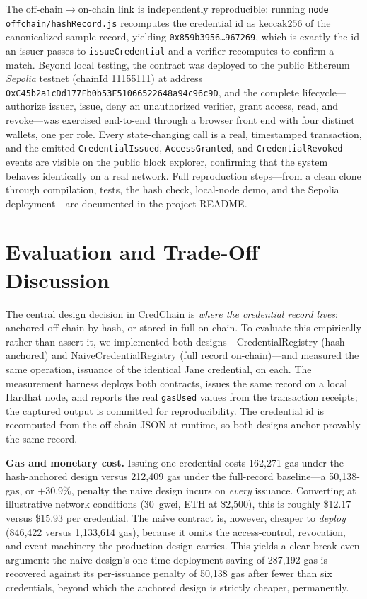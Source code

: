 \documentclass[conference]{IEEEtran}
\begin{document}
The off-chain$\rightarrow$on-chain link is independently reproducible: running \texttt{node offchain/hashRecord.js} recomputes the credential id as $\mathrm{keccak256}$ of the canonicalized sample record, yielding \texttt{0x859b3956\ldots967269}, which is exactly the id an issuer passes to \texttt{issueCredential} and a verifier recomputes to confirm a match. Beyond local testing, the contract was deployed to the public Ethereum \emph{Sepolia} testnet (chainId 11155111) at address \texttt{0xC45b2a1cDd177Fb0b53F51066522648a94c96c9D}, and the complete lifecycle---authorize issuer, issue, deny an unauthorized verifier, grant access, read, and revoke---was exercised end-to-end through a browser front end with four distinct wallets, one per role. Every state-changing call is a real, timestamped transaction, and the emitted \texttt{CredentialIssued}, \texttt{AccessGranted}, and \texttt{CredentialRevoked} events are visible on the public block explorer, confirming that the system behaves identically on a real network. Full reproduction steps---from a clean clone through compilation, tests, the hash check, local-node demo, and the Sepolia deployment---are documented in the project README.

\section{Evaluation and Trade-Off Discussion}

The central design decision in CredChain is \emph{where the credential record lives}: anchored off-chain by hash, or stored in full on-chain. To evaluate this empirically rather than assert it, we implemented both designs---CredentialRegistry (hash-anchored) and NaiveCredentialRegistry (full record on-chain)---and measured the same operation, issuance of the identical Jane credential, on each. The measurement harness deploys both contracts, issues the same record on a local Hardhat node, and reports the real \texttt{gasUsed} values from the transaction receipts; the captured output is committed for reproducibility. The credential id is recomputed from the off-chain JSON at runtime, so both designs anchor provably the same record.

\textbf{Gas and monetary cost.} Issuing one credential costs 162{,}271 gas under the hash-anchored design versus 212{,}409 gas under the full-record baseline---a 50{,}138-gas, or $+30.9\%$, penalty the naive design incurs on \emph{every} issuance. Converting at illustrative network conditions (30~gwei, ETH at \$2{,}500), this is roughly \$12.17 versus \$15.93 per credential. The naive contract is, however, cheaper to \emph{deploy} (846{,}422 versus 1{,}133{,}614 gas), because it omits the access-control, revocation, and event machinery the production design carries. This yields a clear break-even argument: the naive design's one-time deployment saving of 287{,}192 gas is recovered against its per-issuance penalty of 50{,}138 gas after fewer than six credentials, beyond which the anchored design is strictly cheaper, permanently.
\end{document}
